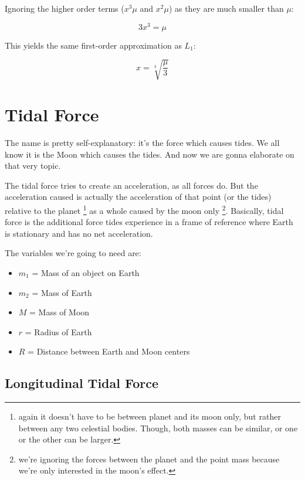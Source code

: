 \documentclass[10pt, a4paper]{article}
\begin{document}
Ignoring the higher order terms ($x^3\mu$ and $x^2\mu$) as they are much smaller than $\mu$:

\begin{equation*}
    3x^3 = \mu
\end{equation*}

This yields the same first-order approximation as $L_1$:

\begin{equation*}
    x = \sqrt[3]{\frac{\mu}{3}}
\end{equation*}



\section{Tidal Force}

The name is pretty self-explanatory: it's the force which causes tides. We all know it is the Moon which causes the tides. And now we are gonna elaborate on that very topic.

The tidal force tries to create an acceleration, as all forces do. But the acceleration caused is actually the acceleration of that point (or the tides) relative to the planet \footnote{again it doesn't have to be between planet and its moon only, but rather between any two celestial bodies. Though, both masses can be similar, or one or the other can be larger.} as a whole caused by the moon only \footnote{we're ignoring the forces between the planet and the point mass because we're only interested in the moon's effect. }. Basically, tidal force is the additional force tides experience in a frame of reference where Earth is stationary and has no net acceleration. 

The variables we're going to need are:
\begin{itemize}
    \item $m_1$ = Mass of an object on Earth 
    \item $m_2$ = Mass of Earth
    \item $M$ = Mass of Moon
    \item $r$ = Radius of Earth
    \item $R$ = Distance between Earth and Moon centers
\end{itemize}

\subsection{Longitudinal Tidal Force}
\end{document}
